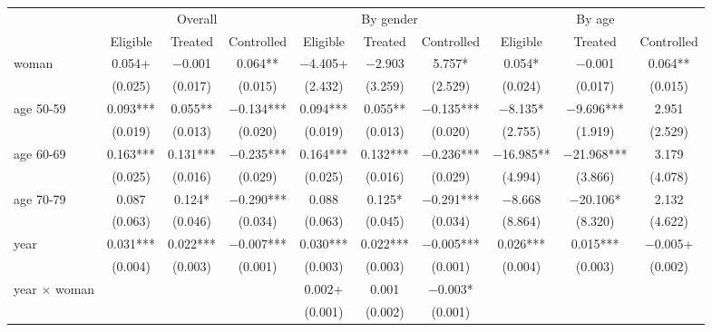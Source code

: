 
\begin{tabular}[t]{lccccccccc}
\toprule
\multicolumn{1}{c}{ } & \multicolumn{3}{c}{Overall} & \multicolumn{3}{c}{By gender} & \multicolumn{3}{c}{By age} \\
\cmidrule(l{3pt}r{3pt}){2-4} \cmidrule(l{3pt}r{3pt}){5-7} \cmidrule(l{3pt}r{3pt}){8-10}
  & Eligible & Treated & Controlled & Eligible  & Treated  & Controlled  & Eligible   & Treated   & Controlled  \\
\midrule
woman & \num{0.054}+ & \num{-0.001} & \num{0.064}** & \num{-4.405}+ & \num{-2.903} & \num{5.757}* & \num{0.054}* & \num{-0.001} & \num{0.064}**\\
 & (\num{0.025}) & (\num{0.017}) & (\num{0.015}) & (\num{2.432}) & (\num{3.259}) & (\num{2.529}) & (\num{0.024}) & (\num{0.017}) & (\num{0.015})\\
age 50-59 & \num{0.093}*** & \num{0.055}** & \num{-0.134}*** & \num{0.094}*** & \num{0.055}** & \num{-0.135}*** & \num{-8.135}* & \num{-9.696}*** & \num{2.951}\\
 & (\num{0.019}) & (\num{0.013}) & (\num{0.020}) & (\num{0.019}) & (\num{0.013}) & (\num{0.020}) & (\num{2.755}) & (\num{1.919}) & (\num{2.529})\\
age 60-69 & \num{0.163}*** & \num{0.131}*** & \num{-0.235}*** & \num{0.164}*** & \num{0.132}*** & \num{-0.236}*** & \num{-16.985}** & \num{-21.968}*** & \num{3.179}\\
 & (\num{0.025}) & (\num{0.016}) & (\num{0.029}) & (\num{0.025}) & (\num{0.016}) & (\num{0.029}) & (\num{4.994}) & (\num{3.866}) & (\num{4.078})\\
age 70-79 & \num{0.087} & \num{0.124}* & \num{-0.290}*** & \num{0.088} & \num{0.125}* & \num{-0.291}*** & \num{-8.668} & \num{-20.106}* & \num{2.132}\\
 & (\num{0.063}) & (\num{0.046}) & (\num{0.034}) & (\num{0.063}) & (\num{0.045}) & (\num{0.034}) & (\num{8.864}) & (\num{8.320}) & (\num{4.622})\\
year & \num{0.031}*** & \num{0.022}*** & \num{-0.007}*** & \num{0.030}*** & \num{0.022}*** & \num{-0.005}*** & \num{0.026}*** & \num{0.015}*** & \num{-0.005}+\\
 & (\num{0.004}) & (\num{0.003}) & (\num{0.001}) & (\num{0.003}) & (\num{0.003}) & (\num{0.001}) & (\num{0.004}) & (\num{0.003}) & (\num{0.002})\\
year $\times$ woman &  &  &  & \num{0.002}+ & \num{0.001} & \num{-0.003}* &  &  & \\
 &  &  &  & (\num{0.001}) & (\num{0.002}) & (\num{0.001}) &  &  & \\

\end{tabular}
